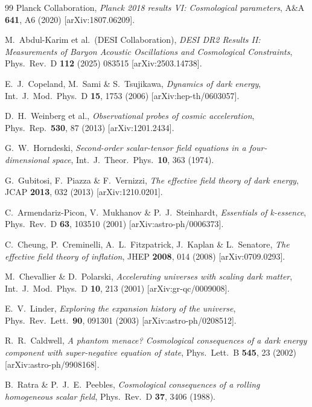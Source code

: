 \documentclass[12pt,a4paper]{article}
\begin{document}
\begin{thebibliography}{99}
Planck Collaboration,
\emph{Planck 2018 results VI: Cosmological parameters},
A\&A \textbf{641}, A6 (2020) [arXiv:1807.06209].

M.~Abdul-Karim et al.\ (DESI Collaboration),
\emph{DESI DR2 Results II: Measurements of Baryon Acoustic Oscillations and
Cosmological Constraints},
Phys.\ Rev.\ D \textbf{112} (2025) 083515 [arXiv:2503.14738].

E.~J.~Copeland, M.~Sami \& S.~Tsujikawa,
\emph{Dynamics of dark energy},
Int.\ J.\ Mod.\ Phys.\ D \textbf{15}, 1753 (2006) [arXiv:hep-th/0603057].

D.~H.~Weinberg et al.,
\emph{Observational probes of cosmic acceleration},
Phys.\ Rep.\ \textbf{530}, 87 (2013) [arXiv:1201.2434].

G.~W.~Horndeski,
\emph{Second-order scalar-tensor field equations in a four-dimensional space},
Int.\ J.\ Theor.\ Phys.\ \textbf{10}, 363 (1974).

G.~Gubitosi, F.~Piazza \& F.~Vernizzi,
\emph{The effective field theory of dark energy},
JCAP \textbf{2013}, 032 (2013) [arXiv:1210.0201].

C.~Armendariz-Picon, V.~Mukhanov \& P.~J.~Steinhardt,
\emph{Essentials of k-essence},
Phys.\ Rev.\ D \textbf{63}, 103510 (2001) [arXiv:astro-ph/0006373].

C.~Cheung, P.~Creminelli, A.~L.~Fitzpatrick, J.~Kaplan \& L.~Senatore,
\emph{The effective field theory of inflation},
JHEP \textbf{2008}, 014 (2008) [arXiv:0709.0293].

M.~Chevallier \& D.~Polarski,
\emph{Accelerating universes with scaling dark matter},
Int.\ J.\ Mod.\ Phys.\ D \textbf{10}, 213 (2001) [arXiv:gr-qc/0009008].

E.~V.~Linder,
\emph{Exploring the expansion history of the universe},
Phys.\ Rev.\ Lett.\ \textbf{90}, 091301 (2003) [arXiv:astro-ph/0208512].

R.~R.~Caldwell,
\emph{A phantom menace? Cosmological consequences of a dark energy component with
super-negative equation of state},
Phys.\ Lett.\ B \textbf{545}, 23 (2002) [arXiv:astro-ph/9908168].

B.~Ratra \& P.~J.~E.~Peebles,
\emph{Cosmological consequences of a rolling homogeneous scalar field},
Phys.\ Rev.\ D \textbf{37}, 3406 (1988).

\end{thebibliography}

\end{document}
